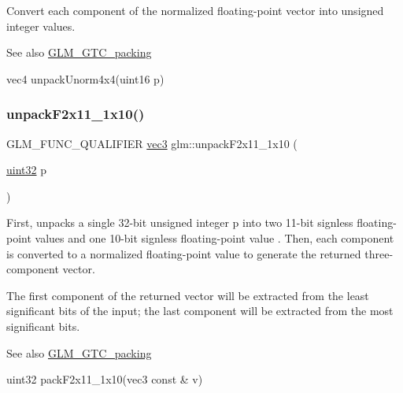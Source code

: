 Convert each component of the normalized floating-\/point vector into unsigned integer values.

\begin{DoxySeeAlso}{See also}
\hyperlink{group__gtc__packing}{G\+L\+M\+\_\+\+G\+T\+C\+\_\+packing} 

vec4 unpack\+Unorm4x4(uint16 p) 
\end{DoxySeeAlso}
\mbox{\label{group__gtc__packing_ga8b9c7991eb021d95c778bf5c0b2f7824}} 
\subsubsection{\texorpdfstring{unpack\+F2x11\+\_\+1x10()}{unpackF2x11\_1x10()}}
{\footnotesize\ttfamily G\+L\+M\+\_\+\+F\+U\+N\+C\+\_\+\+Q\+U\+A\+L\+I\+F\+I\+ER \hyperlink{group__core__types_ga1c47e8b3386109bc992b6c48e91b0be7}{vec3} glm\+::unpack\+F2x11\+\_\+1x10 (\begin{DoxyParamCaption}\item[{\hyperlink{group__gtc__type__precision_ga202b6a53c105fcb7e531f9b443518451}{uint32}}]{p }\end{DoxyParamCaption})}

First, unpacks a single 32-\/bit unsigned integer p into two 11-\/bit signless floating-\/point values and one 10-\/bit signless floating-\/point value . Then, each component is converted to a normalized floating-\/point value to generate the returned three-\/component vector.

The first component of the returned vector will be extracted from the least significant bits of the input; the last component will be extracted from the most significant bits.

\begin{DoxySeeAlso}{See also}
\hyperlink{group__gtc__packing}{G\+L\+M\+\_\+\+G\+T\+C\+\_\+packing} 

uint32 pack\+F2x11\+\_\+1x10(vec3 const \& v) 
\end{DoxySeeAlso}
\mbox{\label{group__gtc__packing_ga15d8845a31e1e55d493803d0c8cb5910}} 
